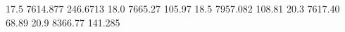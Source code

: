 17.5 7614.877 246.6713
18.0 7665.27 105.97
18.5 7957.082 108.81
20.3 7617.40 68.89
20.9 8366.77 141.285
